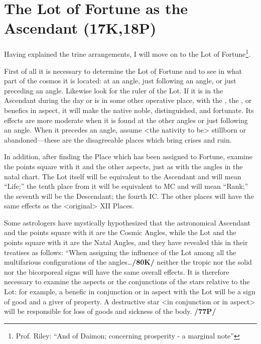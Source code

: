 \section{The Lot of Fortune as the Ascendant (17K,18P)}

Having explained the trine arrangements, I will move on to the Lot of Fortune\footnote{Prof. Riley: ``And of Daimon; concerning prosperity - a marginal note''}. 

First of all it is necessary to determine the Lot of Fortune and to see in what part of the cosmos it is located: at an angle, just following an angle, or just preceding an angle. Likewise look for the ruler of the Lot. If it is in the Ascendant during the day or is in some other operative place, with the \Sun, the \Moon, or benefics in aspect, it will make the native noble, distinguished, and fortunate. Its effects are more moderate when it is found at the other angles or just following an angle. \mndl When it precedes an angle, assume <the nativity to be> stillborn or abandoned—these are the disagreeable places which bring crises and ruin.

In addition, after finding the Place which has been assigned to Fortune, examine the points square with it and the other aspects, just as with the angles in the natal chart. The Lot itself will be equivalent to the Ascendant and will mean “Life;” the tenth place from it will be equivalent to MC and will mean “Rank;” the seventh will be the Descendant; the fourth IC. The other places will have the same effects as the
<original> XII Places. 

Some astrologers have mystically hypothesized that the astronomical Ascendant and the points square with it are the Cosmic Angles, while the Lot and the points square with it are the Natal Angles, and they have revealed this in their treatises as follows: “When assigning the influence of the
Lot among all the multifarious configurations of the angles\ldots \textbf{/80K/} neither the tropic nor the solid nor the bicorporeal signs will have the same overall effects. It is therefore necessary to examine the aspects or the
conjunctions of the stars relative to the Lot: for example, a benefic in conjunction or in aspect with the Lot will be a sign of good and a giver of property. A destructive star <in conjunction or in aspect> will be responsible for loss of goods and sickness of the body. \textbf{/77P/}

\newpage